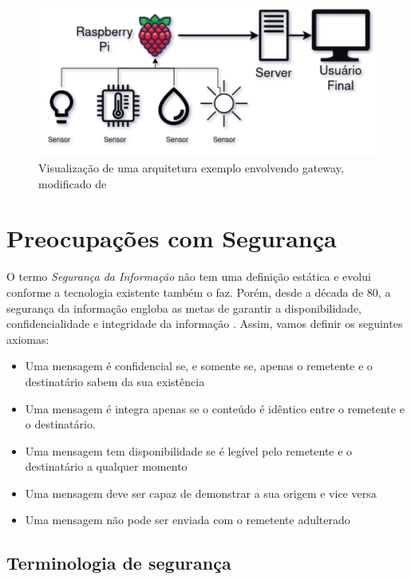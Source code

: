 \documentclass[tcc,capa]{texufpel}
\begin{document}
\begin{figure}[h]
    \centering
    \includegraphics[scale=0.6]{figs/arch.png}
    \medskip
    \caption{Visualização de uma arquitetura exemplo envolvendo gateway, modificado de \cite{gloria2017design}}
    \label{fig:arch}
\end{figure}

\section{Preocupações com Segurança} 

O termo \textit{Segurança da Informação} não tem uma definição estática e evolui conforme a tecnologia existente também o faz. Porém, desde a década de 80, a segurança da informação engloba as metas de garantir a disponibilidade, confidencialidade e integridade da informação \cite{schiller}. Assim, vamos definir os seguintes axiomas:

\begin{itemize}
    \item Uma mensagem é confidencial se, e somente se, apenas o remetente e o destinatário sabem da sua existência
    \item Uma mensagem é integra apenas se o conteúdo é idêntico entre o remetente e o destinatário.
    \item Uma mensagem tem disponibilidade se é legível pelo remetente e o destinatário a qualquer momento
    \item Uma mensagem deve ser capaz de demonstrar a sua origem e vice versa
    \item Uma mensagem não pode ser enviada com o remetente adulterado
\end{itemize}

\subsection{Terminologia de segurança}
\end{document}
